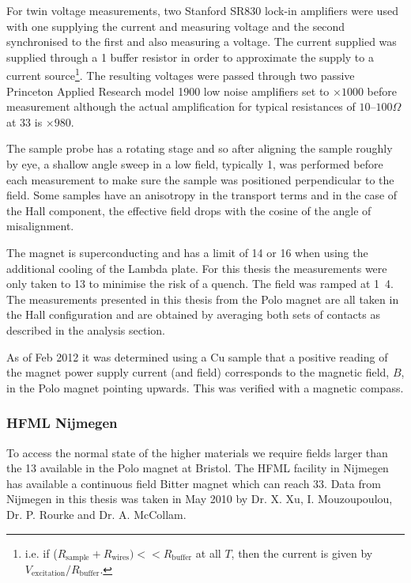 For twin voltage measurements, two Stanford SR830 lock-in amplifiers were used with one supplying the current and measuring voltage and the second synchronised to the first and also measuring a voltage. The current supplied was supplied through a \unit{1}{\kilo\ohm} buffer resistor in order to approximate the supply to a current source\footnote{i.e. if ($R_{\textrm{sample}} + R_{\textrm{wires}}) << R_{\textrm{buffer}} $ at all $T$, then the current is given by $V_{\textrm{excitation}}/R_{\textrm{buffer}}$.}. The resulting voltages were passed through two passive Princeton Applied Research model 1900 low noise amplifiers set to $\times1000$ before measurement although the actual amplification for typical resistances of $10$--$100\Omega$ at \unit{33}{\hertz} is $\times 980$.

The sample probe has a rotating stage and so after aligning the sample roughly by eye, a shallow angle sweep in a low field, typically \unit{1}{\tesla}, was performed before each measurement to make sure the sample was positioned perpendicular to the field. Some samples have an anisotropy in the transport terms and in the case of the Hall component, the effective field drops with the cosine of the angle of misalignment.

The magnet is superconducting and has a limit of \unit{14}{\tesla} or \unit{16}{\tesla} when using the additional cooling of the Lambda plate. For this thesis the measurements were only taken to \unit{13}{\tesla} to minimise the risk of a quench. The field was ramped at \unit{1.4}{\tesla\per\minute}. The measurements presented in this thesis from the Polo magnet are all taken in the Hall configuration and are obtained by averaging both sets of contacts as described in the analysis section.

As of Feb 2012 it was determined using a Cu sample that a positive reading of the magnet power supply current (and field) corresponds to the magnetic field, $B$, in the Polo magnet pointing upwards. This was verified with a magnetic compass.


\subsubsection{\ac{HFML} Nijmegen}

To access the normal state of the higher \Tc materials we require fields larger than the \unit{13}{\tesla} available in the Polo magnet at Bristol. The \ac{HFML} facility in Nijmegen has available a continuous field Bitter magnet which can reach \unit{33}{\tesla}. Data from Nijmegen in this thesis was taken in May 2010 by Dr. X. Xu, I. Mouzoupoulou, Dr. P. Rourke and Dr. A. McCollam.

